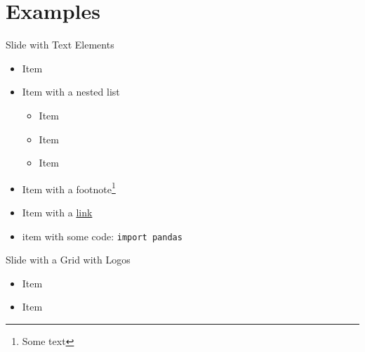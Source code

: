 \section{Examples}

\begin{frame}{Slide with Text Elements} \pause
    \begin{itemize}
        \item Item \pause
        \item Item with a nested list \pause
              \begin{itemize}
                  \item Item \pause
                  \item Item \pause
                  \item Item \pause
              \end{itemize}
        \item Item with a footnote\footnote{Some text} \pause
        \item Item with a \href{https://acs.pub.ro}{link} \pause
        \item item with some code: \texttt{import pandas}
    \end{itemize}
\end{frame}

\begin{frame}{Slide with a Grid with Logos} \pause
    \begin{itemize}
        \item Item \pause
        \item Item
    \end{itemize} \pause

    \vfill

    \begin{figure}
        \centering
        \hspace{1em}
        \hspace{1em}
        \hspace{1em}
    \end{figure}
    \vfill
\end{frame}

